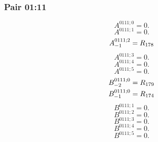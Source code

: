 \documentclass[11pt,a4paper]{article}
\begin{document}
\subsubsection{Pair 01:11}
\begin{equation}
A^{0111;0}=0.
\label{eq:cat-map-102}
\end{equation}
\begin{equation}
A^{0111;1}=0.
\label{eq:cat-map-103}
\end{equation}
\begin{equation}
\shortstack[l]{$\displaystyle A^{0111;2}_{-1}=R_{178}$}
\label{eq:cat-map-104}
\end{equation}
\begin{equation}
A^{0111;3}=0.
\label{eq:cat-map-105}
\end{equation}
\begin{equation}
A^{0111;4}=0.
\label{eq:cat-map-106}
\end{equation}
\begin{equation}
A^{0111;5}=0.
\label{eq:cat-map-107}
\end{equation}
\begin{equation}
\shortstack[l]{$\displaystyle B^{0111;0}_{-2}=R_{179}$\\
$\displaystyle B^{0111;0}_{-1}=R_{174}$}
\label{eq:cat-map-108}
\end{equation}
\begin{equation}
B^{0111;1}=0.
\label{eq:cat-map-109}
\end{equation}
\begin{equation}
B^{0111;2}=0.
\label{eq:cat-map-110}
\end{equation}
\begin{equation}
B^{0111;3}=0.
\label{eq:cat-map-111}
\end{equation}
\begin{equation}
B^{0111;4}=0.
\label{eq:cat-map-112}
\end{equation}
\begin{equation}
B^{0111;5}=0.
\label{eq:cat-map-113}
\end{equation}
\end{document}
